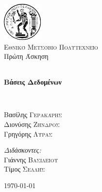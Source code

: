 \begin{titlepage}
\begin{center}

\includegraphics[width=0.15\textwidth]{title/Pyrforos2.png}\\[1.cm]
\textsc{\LARGE Εθνικό Μετσόβιο Πολυτεχνείο}\\[1.5cm]

\Large{ Πρώτη Άσκηση }\\[0.5cm]

\begin{doublespace}
\HRule \\[0.4cm]
{\huge \bfseries
Βάσεις Δεδομένων
}\\[0.4cm]
\end{doublespace}

\HRule \\[1.5cm]

\begin{minipage}{0.4\textwidth}
\begin{flushleft} \large
Βασίλης \textsc{Γερακάρης}\\
Διονύσης \textsc{Ζήνδρος}\\
Γρηγόρης \textsc{Λύρας}\\
\end{flushleft}
\end{minipage}
\begin{minipage}{0.4\textwidth}
\begin{flushright} \large
\emph{Διδάσκοντες:} \\
Γιάννης \textsc{Βασιλείου}\\
Τίμος \textsc{Σελλής}
\end{flushright}
\end{minipage}

\vfill

{\large \today}
\end{center}
\end{titlepage}
